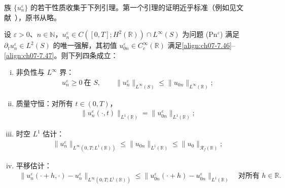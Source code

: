 ﻿\documentclass[../../main.tex]{subfiles}%
\begin{document}
族 $\{u_n^\varepsilon\}$ 的若干性质收集于下列引理。第一个引理的证明近乎标准（例如见文献~\cite{ref34}），原书从略。

\begin{lemma}\label{lemma:ch07-7.4.1}
设 $\varepsilon>0$、$n\in\mathbb{N}$，$u_n^\varepsilon\in C([0,T];H^2(\mathbb{R}))\cap L^\infty(S)$ 为问题 (Pn$^\varepsilon$) 满足 $\partial_t u_n^\varepsilon\in L^2(S)$ 的唯一强解，其初值 $u_{0n}^\varepsilon\in C_c^\infty(\mathbb{R})$ 满足\eqref{align:ch07-7.46}--\eqref{align:ch07-7.47}。则下列四条成立：
\begin{enumerate}[(i)]
\item 非负性与 $L^\infty$ 界：
\begin{align}
u_n^\varepsilon\geqslant0\ \text{在 }S,\qquad
\|u_n^\varepsilon\|_{L^\infty(S)}\leqslant\|u_{0n}\|_{L^\infty(\mathbb{R})}; \label{align:ch07-7.49}
\end{align}
\item 质量守恒：对所有 $t\in(0,T)$，
\begin{align}
\|u_n^\varepsilon(\cdot,t)\|_{L^1(\mathbb{R})}=\|u_{0n}^\varepsilon\|_{L^1(\mathbb{R})}; \label{align:ch07-7.50}
\end{align}
\item 时空 $L^1$ 估计：
\begin{align}
\|u_n^\varepsilon\|_{L^\infty(0,T;L^1(\mathbb{R}))}\leqslant\|u_{0n}\|_{L^1(\mathbb{R})}\leqslant\|u_0\|_{\mathscr{R}_f(\mathbb{R})}; \label{align:ch07-7.51}
\end{align}
\item 平移估计：
\begin{align}
\|u_n^\varepsilon(\cdot+h,\cdot)-u_n^\varepsilon\|_{L^\infty(0,T;L^1(\mathbb{R}))}
\leqslant\|u_{0n}^\varepsilon(\cdot+h)-u_{0n}^\varepsilon\|_{L^1(\mathbb{R})}
\quad\text{对所有 }h\in\mathbb{R}. \label{align:ch07-7.52}
\end{align}
\end{enumerate}
\end{lemma}
\end{document}
